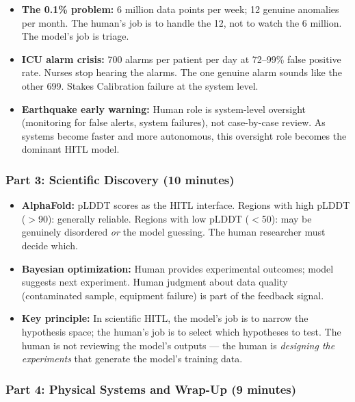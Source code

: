 \begin{itemize}
    \item \textbf{The 0.1\% problem:} 6 million data points per week; 12 genuine anomalies per month. The human's job is to handle the 12, not to watch the 6 million. The model's job is triage.

    \item \textbf{ICU alarm crisis:} 700 alarms per patient per day at 72--99\% false positive rate. Nurses stop hearing the alarms. The one genuine alarm sounds like the other 699. Stakes Calibration failure at the system level.

    \item \textbf{Earthquake early warning:} Human role is system-level oversight (monitoring for false alerts, system failures), not case-by-case review. As systems become faster and more autonomous, this oversight role becomes the dominant HITL model.
\end{itemize}

\subsubsection{Part 3: Scientific Discovery (10 minutes)}

\begin{itemize}
    \item \textbf{AlphaFold:} pLDDT scores as the HITL interface. Regions with high pLDDT ($>$90): generally reliable. Regions with low pLDDT ($<$50): may be genuinely disordered \emph{or} the model guessing. The human researcher must decide which.

    \item \textbf{Bayesian optimization:} Human provides experimental outcomes; model suggests next experiment. Human judgment about data quality (contaminated sample, equipment failure) is part of the feedback signal.

    \item \textbf{Key principle:} In scientific HITL, the model's job is to narrow the hypothesis space; the human's job is to select which hypotheses to test. The human is not reviewing the model's outputs --- the human is \emph{designing the experiments} that generate the model's training data.
\end{itemize}

\subsubsection{Part 4: Physical Systems and Wrap-Up (9 minutes)}

